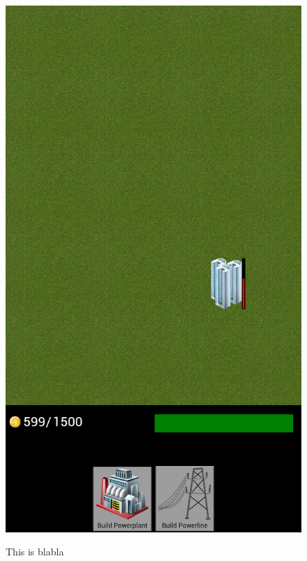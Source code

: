 \begin{figure}[H]
{		\includegraphics[scale=0.17]{pictures/sprint2-screen/sprint2-5}
	}
	\caption{This is blabla}
	\end{figure}

